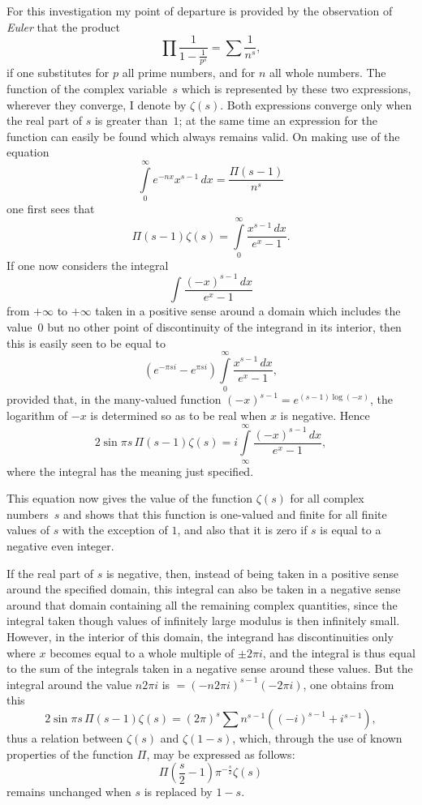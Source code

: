 \documentclass[a4paper,12pt]{article}
\begin{document}
For this investigation my point of departure is provided by
the observation of \emph{Euler} that the product
\[ \prod \frac{1}{\displaystyle 1 - \frac{1}{p^s}}
   = {\textstyle\sum} \frac{1}{n^s},\]
if one substitutes for $p$ all prime numbers, and for $n$
all whole numbers.  The function of the complex variable~$s$
which is represented by these two expressions, wherever
they converge, I denote by $\zeta(s)$.  Both expressions converge
only when the real part of $s$ is greater than~$1$;
at the same time an expression for the function
can easily be found which always remains valid.  On making use of
the equation
\[ \int\limits_0^\infty e^{-nx} x^{s-1} \,dx = \frac{\Pi(s - 1)}{n^s} \]
one first sees that
\[ \Pi(s - 1) \zeta(s) = \int\limits_0^\infty \frac{x^{s-1}\,dx}{e^x - 1}.\]
If one now considers the integral
\[ \int\limits \frac{(-x)^{s-1} \,dx}{e^x - 1} \]
from $+\infty$ to $+\infty$ taken in a positive sense around a
domain which includes the value~$0$ but no other point of 
discontinuity of the integrand in its interior, then this
is easily seen to be equal to
\[ (e^{-\pi si} - e^{\pi si})
      \int\limits_0^\infty \frac{x^{s-1}\,dx}{e^x - 1},\]
provided that, in the many-valued function
$(-x)^{s-1} = e^{(s-1)\log(-x)}$,
the logarithm of $-x$ is determined so as to be real when $x$
is negative.  Hence
\[ 2 \sin \pi s \, \Pi(s - 1) \zeta(s)
   = i \int\limits_\infty^\infty \frac{(-x)^{s-1} \,dx}{e^x - 1},\]
where the integral has the meaning just specified.

This equation now gives the value of the function $\zeta(s)$ for
all complex numbers~$s$ and shows that this function is
one-valued and finite for all finite values of $s$ with the
exception of $1$, and also that it is zero if $s$ is equal
to a negative even integer.

If the real part of $s$ is negative, then, instead of being taken
in a positive sense around the specified domain, this integral can
also be taken in a negative sense around that domain containing all
the remaining complex quantities, since the integral taken though values
of infinitely large modulus is then infinitely small.  However,
in the interior of this domain, the integrand has discontinuities only
where $x$ becomes equal to a whole multiple of $\pm 2\pi i$, and the
integral is thus equal to the sum of the integrals taken in a negative
sense around these values.  But the integral around the value $n2\pi i$
is $= (-n2\pi i)^{s-1}(-2\pi i)$, one obtains from this
\[ 2 \sin \pi s \, \Pi(s - 1) \zeta(s)
   = (2\pi)^s {\textstyle\sum} n^{s-1} ((-i)^{s-1} + i^{s-1}),\]
thus a relation between $\zeta(s)$ and $\zeta(1 - s)$, which,
through the use of known properties of the function $\Pi$, may be
expressed as follows:
\[ \Pi \left( \frac{s}{2} - 1 \right) \pi^{-\frac{s}{2}} \zeta(s) \]
remains unchanged when $s$ is replaced by $1 - s$.
\end{document}
